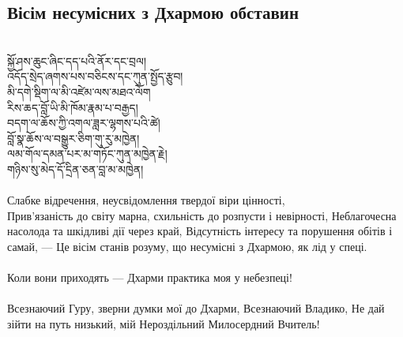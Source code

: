 \subsection*{Вісім несумісних з Дхармою обставин}
\\
\ti
སྐྱོ་ཤས་ཆུང་ཞིང་དད་པའི་ནོར་དང་བྲལ། \\
འདོད་སྲེད་ཞགས་པས་བཅིངས་དང་ཀུན་སྤྱོད་རྩུབ། \\
མི་དགེ་སྡིག་ལ་མི་འཛེམ་ལས་མཐའ་ལོག \\
རིས་ཆད་བློ་ཡི་མི་ཁོམ་རྣམ་པ་བརྒྱད། \\
བདག་ལ་ཆོས་ཀྱི་འགལ་ཟླར་ལྷགས་པའི་ཚེ། \\
བློ་སྣ་ཆོས་ལ་བསྒྱུར་ཅིག་གུ་རུ་མཁྱེན། \\
ལམ་གོལ་དམན་པར་མ་གཏོང་ཀུན་མཁྱེན་རྗེ། \\
གཉིས་སུ་མེད་དོ་དྲིན་ཅན་བླ་མ་མཁྱེན། \\
\\
\ru
Слабке відречення, неусвідомлення твердої віри цінності,\\
Прив'язаність до світу марна, схильність до розпусти і невірності,
Неблагочесна насолода та шкідливі дії через край,
Відсутність інтересу та порушення обітів і самай, ---
Це вісім станів розуму, що несумісні з Дхармою, як лід у спеці.\\
\\
Коли вони приходять --- Дхарми практика моя у небезпеці!\\
\\
Всезнаючий Гуру, зверни думки мої до Дхарми, Всезнаючий Владико,
Не дай зійти на путь низький, мій Нероздільний Милосердний Вчитель!\\

\newpage
